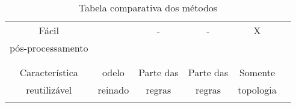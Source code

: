 \begin{table}
\begin{center}
\begin{tabular}{|c|c|c|c|c|c|}
       Fácil             &      &    -     &      -       &      X     \\
       pós-processamento &      &          &              &            \\
                         &      &          &              &            \\
       \hline
                         &         &           &           &          \\
       Característica    & odelo   & Parte das & Parte das & Somente  \\
       reutilizável      & reinado & regras    & regras    & topologia\\
                         &         &           &           &          \\
       \hline
     \end{tabular}
   \caption{Tabela comparativa dos métodos}
   \label{regras}
   \end{center}
 \end{table}
